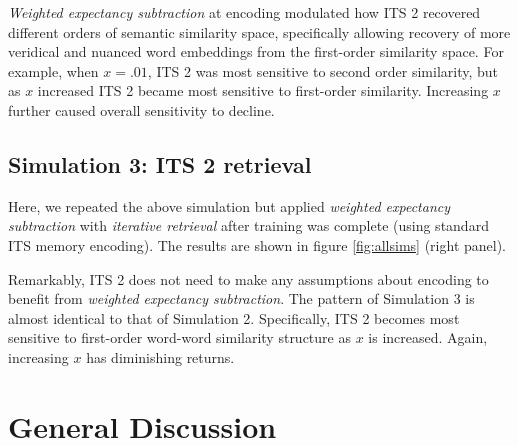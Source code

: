 \documentclass[10pt,letterpaper]{article}
\begin{document}

\emph{Weighted expectancy subtraction} at encoding modulated how ITS 2 recovered different orders of semantic similarity space, specifically allowing recovery of more veridical and nuanced word embeddings from the first-order similarity space. For example, when \(x=.01\), ITS 2 was most sensitive to second order similarity, but as \(x\) increased ITS 2 became most sensitive to first-order similarity. Increasing \(x\) further caused overall sensitivity to decline.

\subsection{Simulation 3: ITS 2 retrieval}

Here, we repeated the above simulation but applied \emph{weighted expectancy subtraction} with \emph{iterative retrieval} after training was complete (using standard ITS memory encoding). The results are shown in figure \ref{fig:allsims} (right panel).


Remarkably, ITS 2 does not need to make any assumptions about encoding to benefit from \emph{weighted expectancy subtraction}. The pattern of Simulation 3 is almost identical to that of Simulation 2. Specifically, ITS 2 becomes most sensitive to first-order word-word similarity structure as \(x\) is increased. Again, increasing \(x\) has diminishing returns.

\section{General Discussion}
\end{document}
